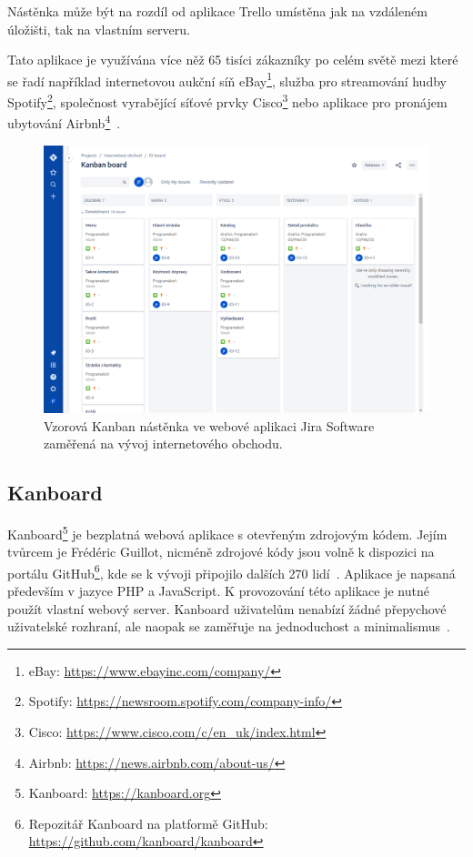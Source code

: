 Nástěnka může být na rozdíl od aplikace Trello umístěna jak na vzdáleném úložišti, tak na vlastním serveru.

Tato aplikace je využívána více něž 65 tisíci zákazníky po celém světě mezi které se řadí například internetovou aukční síň eBay\footnote{eBay: \url{https://www.ebayinc.com/company/}}, služba pro streamování hudby Spotify\footnote{Spotify: \url{https://newsroom.spotify.com/company-info/}}, společnost vyrabějící síťové prvky Cisco\footnote{Cisco: \url{https://www.cisco.com/c/en_uk/index.html}} nebo aplikace pro pronájem ubytování Airbnb\footnote{Airbnb: \url{https://news.airbnb.com/about-us/}}~\cite{bib:jira-homepage}.

\begin{figure}[H]
	\centering
	\includegraphics[width=\textwidth]{obrazky-figures/jira.png}
	\caption{Vzorová Kanban nástěnka ve webové aplikaci Jira Software zaměřená na vývoj internetového obchodu.}
\end{figure}

\subsection{Kanboard}
Kanboard\footnote{Kanboard: \url{https://kanboard.org}} je bezplatná webová aplikace s otevřeným zdrojovým kódem. Jejím tvůrcem je Frédéric Guillot, nicméně zdrojové kódy jsou volně k dispozici na portálu GitHub\footnote{Repozitář Kanboard na platformě GitHub: \url{https://github.com/kanboard/kanboard}}, kde se k vývoji připojilo dalších 270 lidí~\cite{bib:kanboard-github}. Aplikace je napsaná především v jazyce PHP a JavaScript. K provozování této aplikace je nutné použít vlastní webový server. Kanboard uživatelům nenabízí žádné přepychové uživatelské rozhraní, ale naopak se zaměřuje na jednoduchost a minimalismus~\cite{bib:kanboard}.

